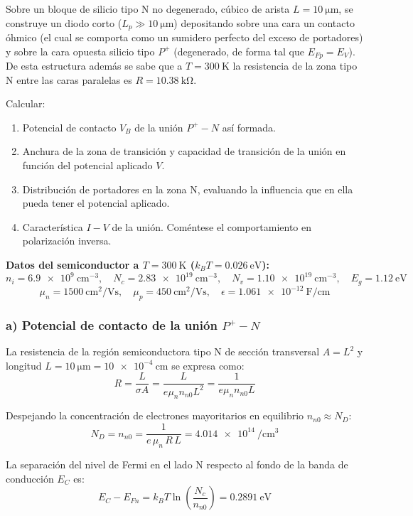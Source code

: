 \newpage
\begin{problema}
Sobre un bloque de silicio tipo N no degenerado, cúbico de arista $L = \SI{10}{\um}$, se construye un diodo corto ($L_p \gg \SI{10}{\um}$) depositando sobre una cara un contacto óhmico (el cual se comporta como un sumidero perfecto del exceso de portadores) y sobre la cara opuesta silicio tipo $P^+$ (degenerado, de forma tal que $E_{Fp} = E_V$). De esta estructura además se sabe que a $T = \SI{300}{\kelvin}$ la resistencia de la zona tipo N entre las caras paralelas es $R = \SI{10.38}{\kilo\ohm}$.

Calcular:
\begin{enumerate}[label=\alph*)]
    \item Potencial de contacto $V_B$ de la unión $P^+-N$ así formada.
    \item Anchura de la zona de transición y capacidad de transición de la unión en función del potencial aplicado $V$.
    \item Distribución de portadores en la zona N, evaluando la influencia que en ella pueda tener el potencial aplicado.
    \item Característica $I-V$ de la unión. Coméntese el comportamiento en polarización inversa.
\end{enumerate}

\textbf{Datos del semiconductor a $T = \SI{300}{\kelvin}$ ($k_B T = \SI{0.026}{\eV}$):}
\[
n_i = \SI{6.9e9}{\cm^{-3}}, \quad N_c = \SI{2.83e19}{\cm^{-3}}, \quad N_v = \SI{1.10e19}{\cm^{-3}}, \quad E_g = \SI{1.12}{\eV}
\]
\[
\mu_n = \SI{1500}{\cm^2/\V\second}, \quad \mu_p = \SI{450}{\cm^2/\V\second}, \quad \epsilon = \SI{1.061e-12}{\farad\per\cm}
\]
\tcblower
\subsubsection*{a) Potencial de contacto de la unión $P^+-N$}

La resistencia de la región semiconductora tipo N de sección transversal $A = L^2$ y longitud $L = \SI{10}{\um} = \SI{10e-4}{\cm}$ se expresa como:
\[
R = \frac{L}{\sigma A} = \frac{L}{e \mu_n n_{n0} L^2} = \frac{1}{e \mu_n n_{n0} L}
\]

Despejando la concentración de electrones mayoritarios en equilibrio $n_{n0} \approx N_D$:
\[
N_D = n_{n0} = \frac{1}{e\,\mu_n\,R\,L} = \SI{4.014e14}{\per\cm\cubed}
\]

La separación del nivel de Fermi en el lado N respecto al fondo de la banda de conducción $E_C$ es:
\[
E_C - E_{Fn} = k_B T \ln\left(\frac{N_c}{n_{n0}}\right) = \SI{0.2891}{\eV}
\]


\end{problema}
